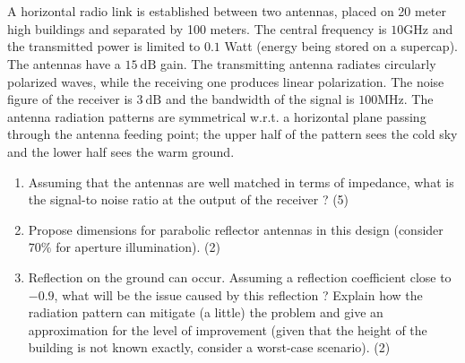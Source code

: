 \documentclass[en]{sourcefiles/eplexam} %
\begin{document}
\nosolution


\section{}

\noindent A horizontal radio link is established between two antennas, placed on 20 meter high buildings and separated by 100 meters. The central frequency is $10 \mathrm{GHz}$ and the transmitted power is limited to $0.1$ Watt (energy being stored on a supercap). The antennas have a $15 \mathrm{~dB}$ gain. The transmitting antenna radiates circularly polarized waves, while the receiving one produces linear polarization. The noise figure of the receiver is $3 \mathrm{~dB}$ and the bandwidth of the signal is $100 \mathrm{MHz}$. The antenna radiation patterns are symmetrical w.r.t. a horizontal plane passing through the antenna feeding point; the upper half of the pattern sees the cold sky and the lower half sees the warm ground.

\begin{enumerate}
    \item Assuming that the antennas are well matched in terms of impedance, what is the signal-to noise ratio at the output of the receiver ? (5)
    \item Propose dimensions for parabolic reflector antennas in this design (consider $70 \%$ for aperture illumination). (2)
    \item Reflection on the ground can occur. Assuming a reflection coefficient close to $-0.9$, what will be the issue caused by this reflection ? Explain how the radiation pattern can mitigate (a little) the problem and give an approximation for the level of improvement (given that the height of the building is not known exactly, consider a worst-case scenario). (2)
\end{enumerate}

\nosolution
\end{document}

